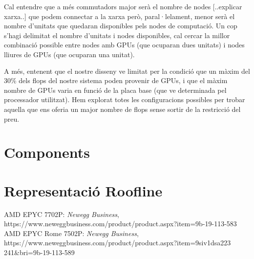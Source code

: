 \documentclass{article}
\begin{document}
Cal entendre que a més commutadors major serà el nombre de nodes [..explicar xarxa..] que podem connectar a la xarxa però, paral·lelament, menor serà el nombre d'unitats que quedaran disponibles pels nodes de computació. Un cop s'hagi delimitat el nombre d'unitats i nodes disponibles, cal cercar la millor combinació possible entre nodes amb GPUs (que ocuparan dues unitats) i nodes lliures de GPUs (que ocuparan una unitat).

A més, entenent que el nostre disseny ve limitat per la condició que un màxim del 30\% dels flops del nostre sistema poden provenir de GPUs, i que el màxim nombre de GPUs varia en funció de la placa base (que ve determinada pel processador utilitzat). Hem explorat totes les configuracions possibles per trobar aquella que ens oferia un major nombre de flops sense sortir de la restricció del preu.


\section{Components}

\section{Representació Roofline}

\begin{thebibliography}{}

 AMD EPYC 7702P: \textit{Newegg Business}, \\
https://www.neweggbusiness.com/product/product.aspx?item=9b-19-113-583
 AMD EPYC Rome 7502P: \textit{Newegg Business}, \\ https://www.neweggbusiness.com/product/product.aspx?item=9siv1dsa223\\241\&bri=9b-19-113-589

\end{thebibliography}
\end{document}
